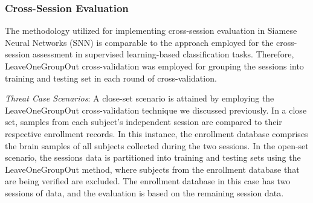 \subsubsection{Cross-Session Evaluation}
The methodology utilized for implementing cross-session evaluation in Siamese Neural Networks (SNN) is comparable to the approach employed for the cross-session assessment in supervised learning-based classification tasks. Therefore, LeaveOneGroupOut cross-validation was employed for grouping the sessions into training and testing set in each round of cross-validation.

\textit{Threat Case Scenarios}: A close-set scenario is attained by employing the LeaveOneGroupOut cross-validation technique we discussed previously. In a close set, samples from each subject's independent session are compared to their respective enrollment records. In this instance, the enrollment database comprises the brain samples of all subjects collected during the two sessions. In the open-set scenario, the sessions data is partitioned into training and testing sets using the LeaveOneGroupOut method, where subjects from the enrollment database that are being verified are excluded. The enrollment database in this case has two sessions of data, and the evaluation is based on the remaining session data.  


